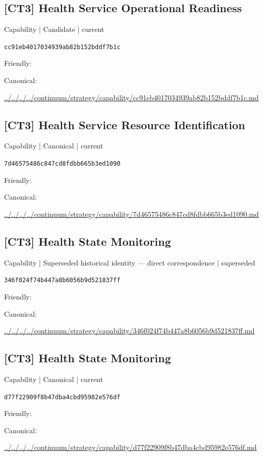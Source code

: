\documentclass[10pt,a4paper]{article}
\begin{document}
\subsection*{[CT3] Health Service Operational Readiness}
{\small Capability | Candidate | current}\par
\texttt{cc91eb4017034939ab82b152bddf7b1c}\par
Friendly: \par
Canonical: \par
{\footnotesize\url{../../../../continuum/strategy/capability/cc91eb4017034939ab82b152bddf7b1c.md}}\par
\subsection*{[CT3] Health Service Resource Identification}
{\small Capability | Canonical | current}\par
\texttt{7d46575486c847cd8fdbb665b3ed1090}\par
Friendly: \par
Canonical: \par
{\footnotesize\url{../../../../continuum/strategy/capability/7d46575486c847cd8fdbb665b3ed1090.md}}\par
\subsection*{[CT3] Health State Monitoring}
{\small Capability | Superseded historical identity — direct correspondence | superseded}\par
\texttt{346f024f74b447a8b6056b9d521837ff}\par
Friendly: \par
Canonical: \par
{\footnotesize\url{../../../../continuum/strategy/capability/346f024f74b447a8b6056b9d521837ff.md}}\par
\subsection*{[CT3] Health State Monitoring}
{\small Capability | Canonical | current}\par
\texttt{d77f22909f8b47dba4cbd95982e576df}\par
Friendly: \par
Canonical: \par
{\footnotesize\url{../../../../continuum/strategy/capability/d77f22909f8b47dba4cbd95982e576df.md}}\par
\end{document}
